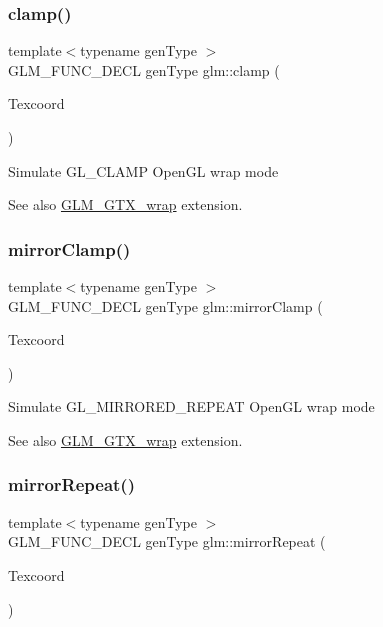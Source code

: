 \subsubsection{\texorpdfstring{clamp()}{clamp()}}
{\footnotesize\ttfamily template$<$typename gen\+Type $>$ \\
G\+L\+M\+\_\+\+F\+U\+N\+C\+\_\+\+D\+E\+CL gen\+Type glm\+::clamp (\begin{DoxyParamCaption}\item[{gen\+Type const \&}]{Texcoord }\end{DoxyParamCaption})}

Simulate G\+L\+\_\+\+C\+L\+A\+MP Open\+GL wrap mode \begin{DoxySeeAlso}{See also}
\hyperlink{group__gtx__wrap}{G\+L\+M\+\_\+\+G\+T\+X\+\_\+wrap} extension. 
\end{DoxySeeAlso}
\mbox{\label{group__gtx__wrap_gaa6856a0a048d2749252848da35e10c8b}} 
\subsubsection{\texorpdfstring{mirror\+Clamp()}{mirrorClamp()}}
{\footnotesize\ttfamily template$<$typename gen\+Type $>$ \\
G\+L\+M\+\_\+\+F\+U\+N\+C\+\_\+\+D\+E\+CL gen\+Type glm\+::mirror\+Clamp (\begin{DoxyParamCaption}\item[{gen\+Type const \&}]{Texcoord }\end{DoxyParamCaption})}

Simulate G\+L\+\_\+\+M\+I\+R\+R\+O\+R\+E\+D\+\_\+\+R\+E\+P\+E\+AT Open\+GL wrap mode \begin{DoxySeeAlso}{See also}
\hyperlink{group__gtx__wrap}{G\+L\+M\+\_\+\+G\+T\+X\+\_\+wrap} extension. 
\end{DoxySeeAlso}
\mbox{\label{group__gtx__wrap_ga16a89b0661b60d5bea85137bbae74d73}} 
\subsubsection{\texorpdfstring{mirror\+Repeat()}{mirrorRepeat()}}
{\footnotesize\ttfamily template$<$typename gen\+Type $>$ \\
G\+L\+M\+\_\+\+F\+U\+N\+C\+\_\+\+D\+E\+CL gen\+Type glm\+::mirror\+Repeat (\begin{DoxyParamCaption}\item[{gen\+Type const \&}]{Texcoord }\end{DoxyParamCaption})}

